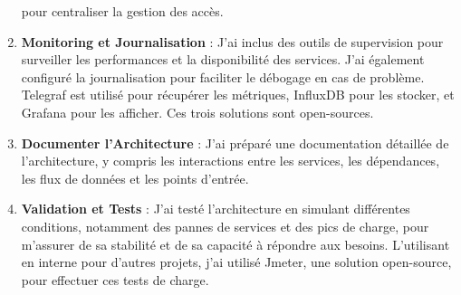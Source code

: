 \documentclass[a4paper, 11pt]{report}
\begin{document}
\begin{enumerate}
  pour centraliser la gestion des accès.
\item \textbf{Monitoring et Journalisation} : J'ai inclus des outils de
  supervision pour surveiller les performances et la disponibilité des
  services. J'ai également configuré la journalisation pour faciliter le
  débogage en cas de problème. Telegraf est utilisé pour récupérer les métriques,
  InfluxDB pour les stocker, et Grafana pour les afficher. Ces trois solutions sont
  open-sources.
\item \textbf{Documenter l'Architecture} : J'ai préparé une documentation
  détaillée de l'architecture, y compris les interactions entre les
  services, les dépendances, les flux de données et les points d'entrée.
\item \textbf{Validation et Tests} : J'ai testé l'architecture en simulant
  différentes conditions, notamment des pannes de services et des pics
  de charge, pour m'assurer de sa stabilité et de sa capacité à répondre
  aux besoins. L'utilisant en interne pour d'autres projets, j'ai utilisé Jmeter, une solution open-source,
  pour effectuer ces tests de charge.
\end{enumerate}
\end{document}
